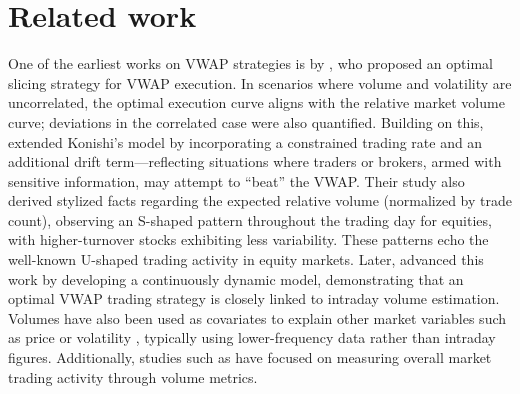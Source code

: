\section{Related work}
One of the earliest works on VWAP strategies is by \cite{Konishi}, who proposed an optimal slicing strategy for VWAP execution. In scenarios where volume and volatility are uncorrelated, the optimal execution curve aligns with the relative market volume curve; deviations in the correlated case were also quantified. Building on this, \cite{Culoch2007} extended Konishi’s model by incorporating a constrained trading rate and an additional drift term—reflecting situations where traders or brokers, armed with sensitive information, may attempt to “beat” the VWAP. Their study also derived stylized facts regarding the expected relative volume (normalized by trade count), observing an S-shaped pattern throughout the trading day for equities, with higher-turnover stocks exhibiting less variability. These patterns echo the well-known U-shaped trading activity in equity markets. Later, \cite{Culoch2012} advanced this work by developing a continuously dynamic model, demonstrating that an optimal VWAP trading strategy is closely linked to intraday volume estimation. Volumes have also been used as covariates to explain other market variables such as price or volatility \cite{Easley1987, Foster, Tauchen1983, Karpoff1987}, typically using lower-frequency data rather than intraday figures. Additionally, studies such as \cite{Gourieroux} have focused on measuring overall market trading activity through volume metrics.

\medskip


